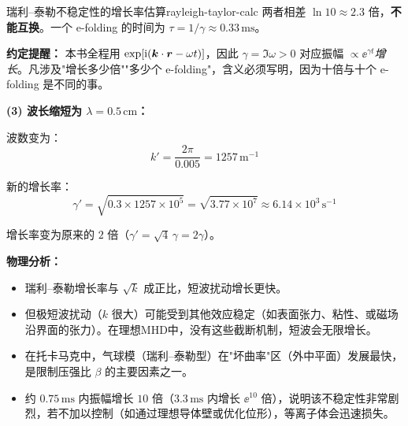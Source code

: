 \begin{example}{瑞利--泰勒不稳定性的增长率估算}{rayleigh-taylor-calc}
两者相差 $\ln10\approx2.3$ 倍，\textbf{不能互换}。一个 e-folding 的时间为 $\tau=1/\gamma\approx0.33\,\mathrm{ms}$。

\textbf{约定提醒：} 本书全程用 $\exp[\mathrm{i}(\bm{k}\cdot\bm{r}-\omega t)]$，因此 $\gamma=\Im\omega>0$ 对应振幅 $\propto\ee^{\gamma t}$\emph{增长}。凡涉及"增长多少倍""多少个 e-folding"，含义必须写明，因为十倍与十个 e-folding 是不同的事。

\textbf{(3) 波长缩短为 $\lambda = 0.5\,\mathrm{cm}$：}

波数变为：
\[
k' = \frac{2\pi}{0.005} = 1257\,\mathrm{m}^{-1}
\]

新的增长率：
\[
\gamma' = \sqrt{0.3\times 1257\times 10^{5}} = \sqrt{3.77\times 10^{7}}
\approx 6.14\times 10^{3}\,\mathrm{s}^{-1}
\]

增长率变为原来的 $2$ 倍（$\gamma' = \sqrt{4}\,\gamma = 2\gamma$）。

\textbf{物理分析：}
\begin{itemize}[leftmargin=*,itemsep=0pt]
\item 瑞利--泰勒增长率与 $\sqrt{k}$ 成正比，短波扰动增长更快。
\item 但极短波扰动（$k$ 很大）可能受到其他效应稳定（如表面张力、粘性、或磁场沿界面的张力）。在理想MHD中，没有这些截断机制，短波会无限增长。
\item 在托卡马克中，气球模（瑞利--泰勒型）在"坏曲率"区（外中平面）发展最快，是限制压强比 $\beta$ 的主要因素之一。
\item 约 $0.75\,\mathrm{ms}$ 内振幅增长 $10$ 倍（$3.3\,\mathrm{ms}$ 内增长 $\ee^{10}$ 倍），说明该不稳定性非常剧烈，若不加以控制（如通过理想导体壁或优化位形），等离子体会迅速损失。
\end{itemize}
\end{example}

